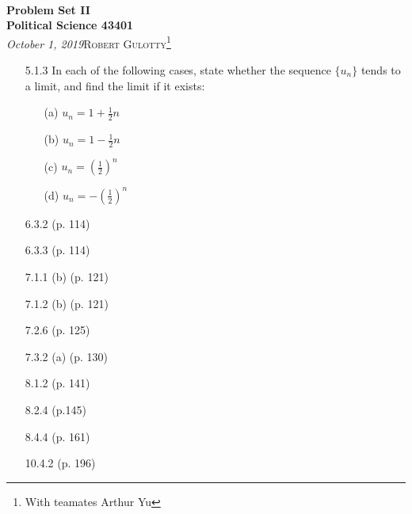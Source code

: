 \documentclass[12pt]{article}
\begin{document}
{\noindent\Huge\bf  \\[0.5\baselineskip] {\selectfont  Problem Set II}         }\\[2\baselineskip] %
{ {\bf {}\selectfont Political Science 43401}\\ {\textit{\selectfont     October 1, 2019}}}\hfill   {\large \textsc{Robert Gulotty}\footnote{With teamates Arthur Yu}} %
\\[1.4\baselineskip] 





\begin{enumerate}

\item[5.1.3] In each of the following cases, state whether the sequence $\{u_n\}$ tends to a limit, and find the limit if it exists:

\begin{itemize}
\item[(a)] $u_n=1+\frac{1}{2}n$
\item[(b)] $u_n=1-\frac{1}{2}n$
\item[(c)] $u_n=(\frac{1}{2})^n$
\item[(d)] $u_n=-(\frac{1}{2})^n$
\end{itemize}

\item[6.3.2] (p. 114)
\item[ 6.3.3] (p. 114)
\item[ 7.1.1] (b) (p. 121)
\item[7.1.2] (b) (p. 121)
\item[7.2.6] (p. 125)
\item[ 7.3.2] (a) (p. 130)
\item[8.1.2] (p. 141)
\item[8.2.4] (p.145)
\item[8.4.4] (p. 161)
\item[10.4.2] (p. 196)

\end{enumerate}
\end{document}
